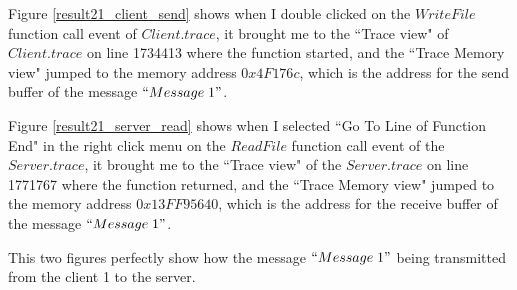 Figure \ref{result21_client_send} shows when I double clicked on the $WriteFile$ function call event of $Client.trace$, it brought me to the ``Trace view" of $Client.trace$ on line 1734413 where the function started, and the ``Trace Memory view" jumped to the memory address $0x4F176c$, which is the address for the send buffer of the message $``Message\; 1"$.

Figure \ref{result21_server_read} shows when I selected ``Go To Line of Function End" in the right click menu on the $ReadFile$ function call event of the $Server.trace$, it brought me to the ``Trace view" of the $Server.trace$ on line 1771767 where the function returned, and the ``Trace Memory view" jumped to the memory address $0x13FF95640$, which is the address for the receive buffer of the message $``Message\; 1"$.

This two figures perfectly show how the message $``Message\; 1"$ being transmitted from the client 1 to the server.

